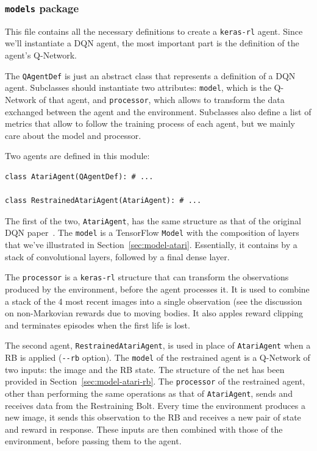 \subsubsection*{\texttt{models} package}

This file contains all the necessary definitions to create a \texttt{keras-rl}
agent. Since we'll instantiate a DQN agent, the most important part is
the definition of the agent's Q-Network.

The \texttt{QAgentDef} is just an abstract class that represents a definition
of a DQN agent. Subclasses should instantiate two attributes:
\texttt{model}, which is the Q-Network of that agent, and \texttt{processor},
which allows to transform the data exchanged between the agent and the
environment.  Subclasses also define a list of metrics that allow to follow
the training process of each agent, but we mainly care about the model and
processor.

Two agents are defined in this module:
\begin{lstlisting}[style=python]
class AtariAgent(QAgentDef): # ...

class RestrainedAtariAgent(AtariAgent): # ...
\end{lstlisting}

The first of the two, \texttt{AtariAgent}, has the same structure as that of
the original DQN paper~\cite{bib:atari-deeprl}. The \texttt{model} is a
TensorFlow \texttt{Model} with the composition of layers that we've
illustrated in Section~\ref{sec:model-atari}. Essentially, it contains by a
stack of convolutional layers, followed by a final dense layer.

The \texttt{processor} is a \verb|keras-rl| structure that can transform the
observations produced by the environment, before the agent processes it. It is
used to combine a stack of the 4 most recent images into a single observation
(see the discussion on non-Markovian rewards due to moving bodies. It also
apples reward clipping and terminates episodes when the first life is lost.

The second agent, \texttt{RestrainedAtariAgent}, is used in place of
\texttt{AtariAgent} when a RB is applied (\verb|--rb| option). The
\texttt{model} of the restrained agent is a Q-Network of two inputs: the image
and the RB state. The structure of the net has been provided in
Section~\ref{sec:model-atari-rb}. The \texttt{processor} of the restrained
agent, other than performing the same operations as that of
\texttt{AtariAgent}, sends and receives data from the Restraining Bolt. Every
time the environment produces a new image, it sends this observation to the
RB and receives a new pair of state and reward in response. These inputs are
then combined with those of the environment, before passing them to the agent.

